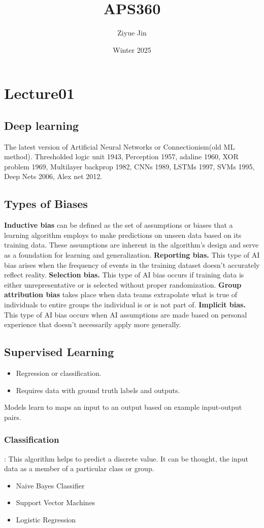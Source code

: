 \documentclass[11pt, english]{article}
\title{APS360}
\author{Ziyue Jin}
\date{Winter 2025}
\begin{document}
\maketitle
\newpage
\section{Lecture01}
\subsection{Deep learning}
The latest version of Artificial Neural Networks or Connectionism(old ML method).
Thresholded logic unit 1943, Perception 1957, adaline 1960, XOR problem 1969, Multilayer backprop 1982, CNNs 1989, LSTMs 1997, SVMs 1995, Deep Nets 2006, Alex net 2012.

\subsection{Types of Biases}
\textbf{Inductive bias} can be defined as the set of assumptions or biases that a learning algorithm employs to make predictions on unseen data based on its training data. These assumptions are inherent in the algorithm's design and serve as a foundation for learning and generalization.
\textbf{Reporting bias.} This type of AI bias arises when the frequency of events in the training dataset doesn’t accurately reflect reality. 
\textbf{Selection bias. }This type of AI bias occurs if training data is either unrepresentative or is selected without proper randomization.  
\textbf{Group attribution bias} takes place when data teams extrapolate what is true of individuals to entire groups the individual is or is not part of.  
\textbf{Implicit bias.} This type of AI bias occurs when AI assumptions are made based on personal experience that doesn’t necessarily apply more generally.  

\subsection{Supervised Learning}
\begin{itemize}
    \item Regression or classification.
    \item Requires data with ground truth labels and outputs.
\end{itemize}
Models learn to maps an input to an output based on example input-output pairs.
\subsubsection{Classification}: This algorithm helps to predict a discrete value. It can be thought, the input data as a member of a particular class or group. 
\begin{itemize}
    \item Naive Bayes Classifier
    \item Support Vector Machines
    \item Logistic Regression
\end{itemize}
\end{document}

